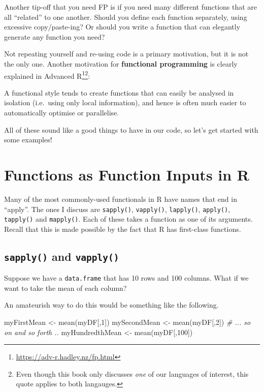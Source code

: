 \documentclass[
  12pt,
  krantz2]{krantz}
\makeatletter
\newenvironment{Shaded}{\begin{snugshade}}{\end{snugshade}}
\newcommand{\CommentTok}[1]{\textcolor[rgb]{0.37,0.37,0.37}{\textit{#1}}}
\newcommand{\DecValTok}[1]{\textcolor[rgb]{0.06,0.06,0.06}{#1}}
\newcommand{\FunctionTok}[1]{\textcolor[rgb]{0,0,0}{#1}}
\newcommand{\NormalTok}[1]{#1}
\newcommand{\OtherTok}[1]{\textcolor[rgb]{0.37,0.37,0.37}{#1}}
\renewenvironment{quote}{\begin{VF}}{\end{VF}}
\renewcommand{\href}[2]{#2\footnote{\url{#1}}}
\newenvironment{kframe}{%
\medskip{}
\setlength{\fboxsep}{.8em}
 \def\at@end@of@kframe{}%
 \ifinner\ifhmode%
  \def\at@end@of@kframe{\end{minipage}}%
  \begin{minipage}{\columnwidth}%
 \fi\fi%
 \def\FrameCommand##1{\hskip\@totalleftmargin \hskip-\fboxsep
 \colorbox{shadecolor}{##1}\hskip-\fboxsep
     \hskip-\linewidth \hskip-\@totalleftmargin \hskip\columnwidth}%
 \MakeFramed {\advance\hsize-\width
   \@totalleftmargin\z@ \linewidth\hsize
   \@setminipage}}%
 {\par\unskip\endMakeFramed%
 \at@end@of@kframe}
\renewenvironment{Shaded}{\begin{kframe}}{\end{kframe}}
\makeatother
\begin{document}
Another tip-off that you need FP is if you need many different functions that are all ``related'' to one another. Should you define each function separately, using excessive copy/paste-ing? Or should you write a function that can elegantly generate any function you need?

Not repeating yourself and re-using code is a primary motivation, but it is not the only one. Another motivation for \textbf{functional programming} is clearly explained in \href{https://adv-r.hadley.nz/fp.html}{Advanced R}\footnote{Even though this book only discusses \emph{one} of our languages of interest, this quote applies to both langauges.}:

\begin{quote}
A functional style tends to create functions that can easily be analysed in isolation (i.e.~using only local information), and hence is often much easier to automatically optimise or parallelise.
\end{quote}

All of these sound like a good things to have in our code, so let's get started with some examples!

\hypertarget{functions-as-function-inputs-in-r}{%
\section{Functions as Function Inputs in R}\label{functions-as-function-inputs-in-r}}

Many of the most commonly-used functionals in R have names that end in ``apply''. The ones I discuss are \texttt{sapply()}, \texttt{vapply()}, \texttt{lapply()}, \texttt{apply()}, \texttt{tapply()} and \texttt{mapply()}. Each of these takes a function as one of its arguments. Recall that this is made possible by the fact that R has first-class functions.

\hypertarget{sapply-and-vapply}{%
\subsection{\texorpdfstring{\texttt{sapply()} and \texttt{vapply()}}{sapply() and vapply()}}\label{sapply-and-vapply}}

Suppose we have a \texttt{data.frame} that has 10 rows and 100 columns. What if we want to take the mean of each column?

An amateurish way to do this would be something like the following.

\begin{Shaded}
\begin{Highlighting}[]
\NormalTok{myFirstMean }\OtherTok{\textless{}{-}} \FunctionTok{mean}\NormalTok{(myDF[,}\DecValTok{1}\NormalTok{])}
\NormalTok{mySecondMean }\OtherTok{\textless{}{-}} \FunctionTok{mean}\NormalTok{(myDF[,}\DecValTok{2}\NormalTok{])}
\CommentTok{\# ... so on and so forth ..}
\NormalTok{myHundredthMean }\OtherTok{\textless{}{-}} \FunctionTok{mean}\NormalTok{(myDF[,}\DecValTok{100}\NormalTok{])}
\end{Highlighting}
\end{Shaded}
\end{document}
